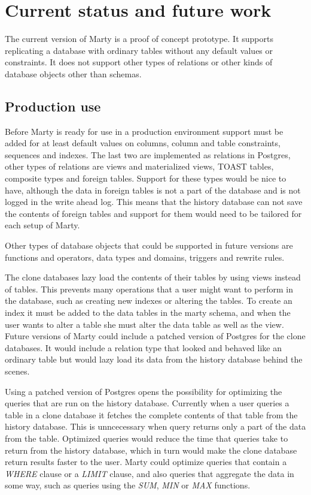 \chapter{Current status and future work}
The current version of Marty is a proof of concept prototype.
It supports replicating a database with ordinary tables without any default values or constraints.
It does not support other types of relations or other kinds of database objects other than schemas.

\section{Production use}
Before Marty is ready for use in a production environment support must be added for at least default values on columns, column and table constraints, sequences and indexes.
The last two are implemented as relations in Postgres, other types of relations are views and materialized views, TOAST tables, composite types and foreign tables.
Support for these types would be nice to have, although the data in foreign tables is not a part of the database and is not logged in the write ahead log.
This means that the history database can not save the contents of foreign tables and support for them would need to be tailored for each setup of Marty.

Other types of database objects that could be supported in future versions are functions and operators, data types and domains, triggers and rewrite rules.

The clone databases lazy load the contents of their tables by using views instead of tables.
This prevents many operations that a user might want to perform in the database, such as creating new indexes or altering the tables.
To create an index it must be added to the data tables in the marty schema, and when the user wants to alter a table she must alter the data table as well as the view.
Future versions of Marty could include a patched version of Postgres for the clone databases.
It would include a relation type that looked and behaved like an ordinary table but would lazy load its data from the history database behind the scenes.

Using a patched version of Postgres opens the possibility for optimizing the queries that are run on the history database.
Currently when a user queries a table in a clone database it fetches the complete contents of that table from the history database.
This is unncecessary when query returns only a part of the data from the table.
Optimized queries would reduce the time that queries take to return from the history database, which in turn would make the clone database return results faster to the user.
Marty could optimize queries that contain a \textit{WHERE} clause or a \textit{LIMIT} clause, and also queries that aggregate the data in some way, such as queries using the \textit{SUM}, \textit{MIN} or \textit{MAX} functions.

